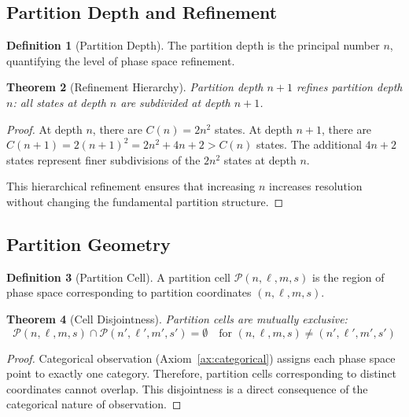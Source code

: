 \documentclass[11pt,twocolumn,a4paper]{article}
\newtheorem{theorem}{Theorem}[section]
\theoremstyle{definition}
\newtheorem{definition}[theorem]{Definition}
\theoremstyle{remark}
\begin{document}
\subsection{Partition Depth and Refinement}

\begin{definition}[Partition Depth]
\label{def:partition_depth}
The partition depth is the principal number $n$, quantifying the level of phase space refinement.
\end{definition}

\begin{theorem}[Refinement Hierarchy]
\label{thm:refinement_hierarchy}
Partition depth $n+1$ refines partition depth $n$: all states at depth $n$ are subdivided at depth $n+1$.
\end{theorem}

\begin{proof}
At depth $n$, there are $C(n) = 2n^2$ states. At depth $n+1$, there are $C(n+1) = 2(n+1)^2 = 2n^2 + 4n + 2 > C(n)$ states. The additional $4n+2$ states represent finer subdivisions of the $2n^2$ states at depth $n$.

This hierarchical refinement ensures that increasing $n$ increases resolution without changing the fundamental partition structure.
\end{proof}

\subsection{Partition Geometry}

\begin{definition}[Partition Cell]
\label{def:partition_cell}
A partition cell $\mathcal{P}(n,\ell,m,s)$ is the region of phase space corresponding to partition coordinates $(n,\ell,m,s)$.
\end{definition}

\begin{theorem}[Cell Disjointness]
\label{thm:cell_disjoint}
Partition cells are mutually exclusive:
\begin{equation}
\mathcal{P}(n,\ell,m,s) \cap \mathcal{P}(n',\ell',m',s') = \emptyset \quad \text{for } (n,\ell,m,s) \neq (n',\ell',m',s')
\label{eq:cell_disjoint}
\end{equation}
\end{theorem}

\begin{proof}
Categorical observation (Axiom~\ref{ax:categorical}) assigns each phase space point to exactly one category. Therefore, partition cells corresponding to distinct coordinates cannot overlap. This disjointness is a direct consequence of the categorical nature of observation.
\end{proof}
\end{document}
